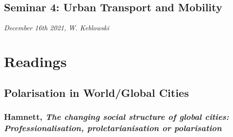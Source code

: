 \documentclass{article}
\begin{document}
\subsection{Seminar 4: Urban Transport and Mobility}
\textit{December 16th 2021, W. Keblowski}



\section{Readings}

\subsection{Polarisation in World/Global Cities}

\subsubsection{Hamnett, \textit{The changing social structure of global cities: Professionalisation, proletarianisation or polarisation}}
\end{document}
